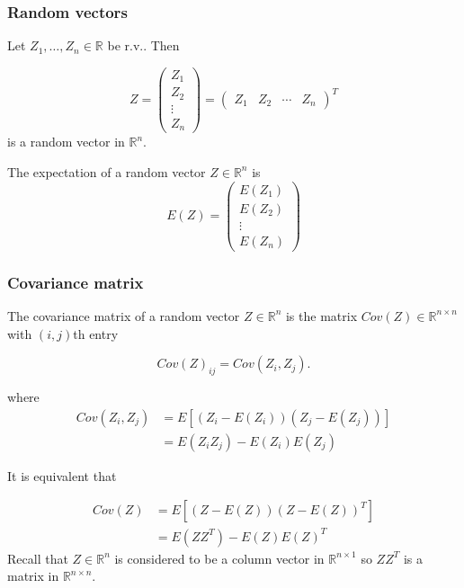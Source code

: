 \documentclass[mathserif]{beamer}
\begin{document}
\begin{frame}
\frametitle{Random vectors}

Let $Z_1, \ldots, Z_n \in \mathbb{R}$ be r.v.. Then 

$$Z =  \begin{pmatrix}
Z_1 \\
Z_2 \\
\vdots \\
Z_n
\end{pmatrix}
= 
\begin{pmatrix}
Z_1 & Z_2 & \cdots & Z_n
\end{pmatrix}^T
$$
is a random vector in $\mathbb{R}^n.$

\vspace*{1em}

The expectation of a random vector $Z \in \mathbb{R}^n$ is 
$$E(Z) = \begin{pmatrix}
E(Z_1) \\
E(Z_2)\\
\vdots \\
E(Z_n)
\end{pmatrix}
$$

\end{frame}

\begin{frame}
\frametitle{Covariance matrix}

The covariance matrix of a random vector $Z \in \mathbb{R}^{n}$ is the matrix 
$Cov(Z) \in \mathbb{R}^{n \times n}$ with $(i,j)$th entry

$$Cov(Z)_{ij} = Cov(Z_i, Z_j).$$

where 
\begin{align}
Cov(Z_i, Z_j)
& = 
E \left[
(
Z_i - E(Z_i)
)
(Z_j - E(Z_j)
)
\right ] \\
&= E(Z_i Z_j) - E(Z_i) E(Z_j)
\end{align}

It is equivalent that 

\begin{align}
Cov(Z)
& = 
E \left[
(
Z - E(Z)
)
(Z - E(Z)
)^T
\right ] \\
&= E(Z Z^T) - E(Z) E(Z)^T
\end{align}
Recall that $Z \in \mathbb{R}^n$ is considered to be a column vector in $\mathbb{R}^{n \times 1}$ so 
$ZZ^T$ is a matrix in $\mathbb{R}^{n \times n}.$ 
\end{frame}
\end{document}
